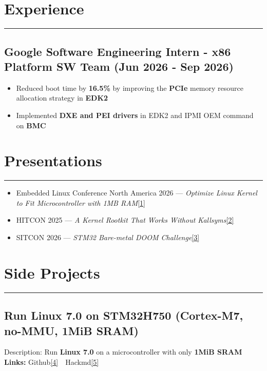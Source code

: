 \documentclass[11pt]{article}
\begin{document}
\section*{Experience}
\vspace{-9pt}\noindent\rule{\linewidth}{0.6pt}\vspace{-1pt}
\subsection*{Google Software Engineering Intern - x86 Platform SW Team (Jun 2026 - Sep 2026)}
\begin{itemize}
  \item Reduced boot time by \textbf{16.5\%} by improving the \textbf{PCIe} memory resource allocation strategy in \textbf{EDK2}
  \item Implemented \textbf{DXE and PEI drivers} in EDK2 and IPMI OEM command on \textbf{BMC}
\end{itemize}

\section*{Presentations}
\vspace{-9pt}\noindent\rule{\linewidth}{0.6pt}\vspace{3pt}
\begin{itemize}
  \item Embedded Linux Conference North America 2026 --- \emph{Optimize Linux Kernel to Fit Microcontroller with 1MB RAM}\hyperlink{l1}{[1]}
  \item HITCON 2025 --- \emph{A Kernel Rootkit That Works Without Kallsyms}\hyperlink{l2}{[2]}
  \item SITCON 2026 --- \emph{STM32 Bare-metal DOOM Challenge}\hyperlink{l3}{[3]}
\end{itemize}

\section*{Side Projects}
\vspace{-9pt}\noindent\rule{\linewidth}{0.6pt}\vspace{-1pt}

\subsection*{Run Linux 7.0 on STM32H750 (Cortex-M7, no-MMU, 1MiB SRAM)}
\vspace{1pt}
Description: Run \textbf{Linux 7.0} on a microcontroller with only \textbf{1MiB SRAM}\\
{\small\textbf{Links:} Github\hyperlink{l4}{[4]}\ \ Hackmd\hyperlink{l5}{[5]}}
\end{document}
